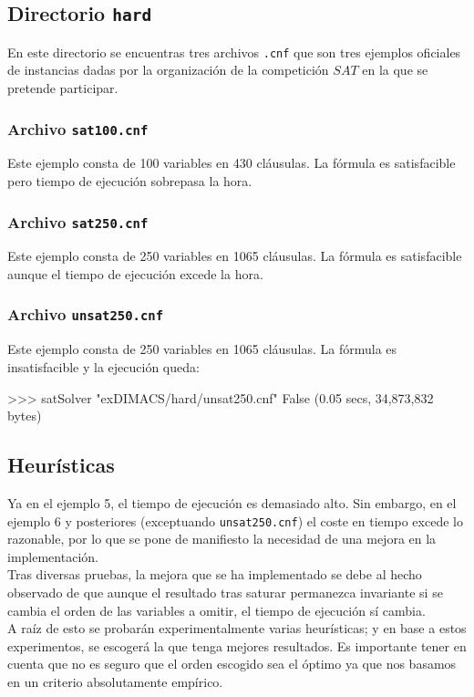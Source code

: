 \subsection{Directorio \texttt{hard}}

En este directorio se encuentras tres archivos \texttt{.cnf} que son tres ejemplos oficiales de instancias dadas por la organización de la competición $SAT$ en la que se pretende participar.

\subsubsection{Archivo \texttt{sat100.cnf}}
Este ejemplo consta de 100 variables en 430 cláusulas. La fórmula es satisfacible pero tiempo de ejecución sobrepasa la hora.
\subsubsection{Archivo \texttt{sat250.cnf}}
Este ejemplo consta de 250 variables en 1065 cláusulas. La fórmula es satisfacible aunque el tiempo de ejecución excede la hora.
\subsubsection{Archivo \texttt{unsat250.cnf}}
Este ejemplo consta de 250 variables en 1065 cláusulas. La fórmula es insatisfacible y la ejecución queda:
\begin{code}
>>> satSolver "exDIMACS/hard/unsat250.cnf"
False
(0.05 secs, 34,873,832 bytes)
\end{code}

\subsection{Heurísticas}
Ya en el ejemplo 5, el tiempo de ejecución es demasiado alto. Sin embargo, en el ejemplo 6 y posteriores (exceptuando \texttt{unsat250.cnf}) el coste en tiempo excede lo razonable, por lo que se pone de manifiesto la necesidad de una mejora en la implementación.\\

Tras diversas pruebas, la mejora que se ha implementado se debe al hecho observado de que aunque el resultado tras saturar permanezca invariante si se cambia el orden de las variables a omitir, el tiempo de ejecución sí cambia.\\

A raíz de esto se probarán experimentalmente varias heurísticas; y en base a estos experimentos, se escogerá la que tenga mejores resultados. Es importante tener en cuenta que no es seguro que el orden escogido sea el óptimo ya que nos basamos en un criterio absolutamente empírico.\\

